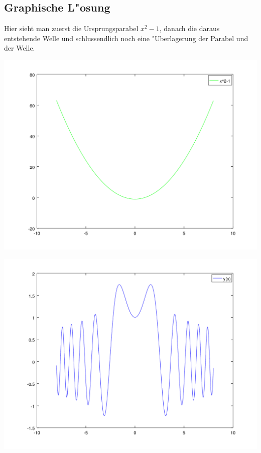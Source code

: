 \begin{refsection}
\section{Graphische L"osung}

Hier sieht man zuerst die Ursprungsparabel $x^2-1$, danach die daraus 
entstehende Welle und schlussendlich noch eine "Uberlagerung der Parabel und 
der Welle.

\includegraphics[scale=0.6]{./wellen/octave/images/a01a10/parabola.png}

\includegraphics[scale=0.6]{./wellen/octave/images/a01a10/wave.png}


\end{refsection}
